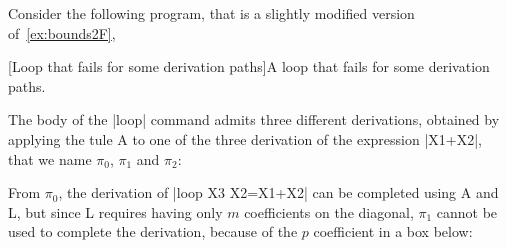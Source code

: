 \begin{example}\label{ex:partial}
Consider the following program, that is a slightly modified version of~\autoref{ex:bounds2F},

[Loop that fails for some derivation paths]{A loop that fails for some derivation paths.}
\label{lst:partial-fail}

The body of the \pr|loop| command admits three different derivations,
obtained by applying the tule A to one of the three derivation of the expression
\pr|X1+X2|, that we name \(\pi_0\), \(\pi_1\) and \(\pi_2\):

\begin{center}
\hfill
{}
\hfill
{}
\end{center}

From \(\pi_0\), the derivation of  \pr|loop X3 {X2=X1+X2}| can be
completed using A and L, but since L requires having only \(m\) coefficients
on the diagonal, \(\pi_1\) cannot be used to complete the derivation,
because of the \(p\) coefficient in a box below:


\end{example}
